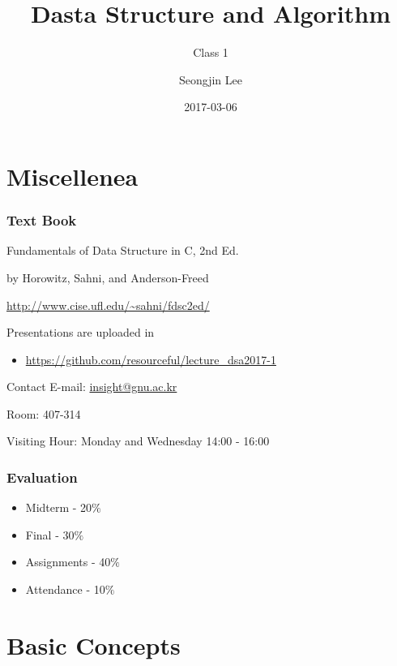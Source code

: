 \documentclass[newPxFont,sthlmFooter,nooffset]{beamer}
\title{Dasta Structure and Algorithm}
\subtitle{Class 1}
\author[SJL]{Seongjin Lee}
\institute{\href{mailto:insight@gnu.ac.kr}{insight@gnu.ac.kr}\\\url{http://resourceful.github.io}\\Systems Research Lab.\\GNU}
\date{2017-03-06}
\begin{document}
\frame[plain,t]{\titlepage} 



\section{Miscellenea} 



\begin{frame}[t]
  \frametitle{Text Book}
Fundamentals of Data Structure in C, 2nd Ed.

by Horowitz, Sahni, and Anderson-Freed


\url{http://www.cise.ufl.edu/~sahni/fdsc2ed/}

Presentations are uploaded in 
\begin{itemize}
\item \url{https://github.com/resourceful/lecture_dsa2017-1}
\end{itemize}
\end{frame}

\begin{frame}[t]{Contact}
E-mail: \url{insight@gnu.ac.kr}

Room: 407-314

Visiting Hour: Monday and Wednesday 14:00 - 16:00

\end{frame}

\begin{frame}[t]
  \frametitle{Evaluation}
  \begin{itemize}
  \item Midterm - 20$\%$
  \item Final - 30$\%$
  \item Assignments - 40$\%$ 
  \item Attendance - 10$\%$
  \end{itemize}
\end{frame}


\section{Basic Concepts}
\end{document}
